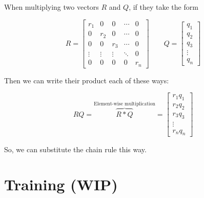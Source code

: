         \begin{concept}
            When multiplying two vectors $R$ and $Q$, if they take the form
            
            \begin{equation*}
                R = 
                \begin{bmatrix}
                    r_1     &0      &0      &\cdots & 0 \\
                    0       &r_2    &0      &\cdots & 0 \\
                    0       &0      &r_3    &\cdots & 0 \\
                    \vdots  &\vdots &\vdots &\ddots & 0 \\
                    0       &0      &0      &0      & r_n 
                \end{bmatrix}
                \qquad
                Q =
                \begin{bmatrix}
                    q_1 \\ q_2\\ q_3 \\ \vdots \\q_n
                \end{bmatrix}
            \end{equation*}
            
            Then we can write their product each of these ways:
            
            \begin{equation}
                RQ = 
                \overbrace{
                    R * Q
                }^{\text{Element-wise multiplication}}
                =
                \begin{bmatrix}
                    r_1q_1 \\ r_2q_2\\ r_3q_3 \\ \vdots \\r_nq_n
                \end{bmatrix}
            \end{equation}
        \end{concept}
        
        So, we can substitute the chain rule this way.

        

        
        
\pagebreak
\section{Training (WIP)}
    \label{training}
    
